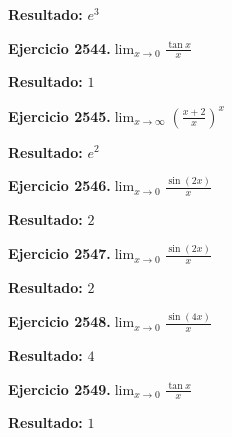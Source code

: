 \documentclass[10pt,a4paper]{article}
\begin{document}
\begin{solbox}
\textbf{Resultado:} \(\displaystyle e^{3}\)
\end{solbox}

\newpage
\begin{ejbox}
\textbf{Ejercicio 2544.}\quad $\lim_{x\to 0} \frac{\tan x}{x}$
\end{ejbox}

\begin{solbox}
\textbf{Resultado:} \(\displaystyle 1\)
\end{solbox}

\begin{ejbox}
\textbf{Ejercicio 2545.}\quad $\lim_{x\to \infty} \left(\frac{x+2}{x}\right)^{x}$
\end{ejbox}

\begin{solbox}
\textbf{Resultado:} \(\displaystyle e^{2}\)
\end{solbox}

\begin{ejbox}
\textbf{Ejercicio 2546.}\quad $\lim_{x\to 0} \frac{\sin(2x)}{x}$
\end{ejbox}

\begin{solbox}
\textbf{Resultado:} \(\displaystyle 2\)
\end{solbox}

\newpage
\begin{ejbox}
\textbf{Ejercicio 2547.}\quad $\lim_{x\to 0} \frac{\sin(2x)}{x}$
\end{ejbox}

\begin{solbox}
\textbf{Resultado:} \(\displaystyle 2\)
\end{solbox}

\begin{ejbox}
\textbf{Ejercicio 2548.}\quad $\lim_{x\to 0} \frac{\sin(4x)}{x}$
\end{ejbox}

\begin{solbox}
\textbf{Resultado:} \(\displaystyle 4\)
\end{solbox}

\begin{ejbox}
\textbf{Ejercicio 2549.}\quad $\lim_{x\to 0} \frac{\tan x}{x}$
\end{ejbox}

\begin{solbox}
\textbf{Resultado:} \(\displaystyle 1\)
\end{solbox}
\end{document}

